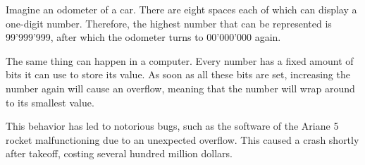 
Imagine an odometer of a car. There are eight spaces each of which can display a one-digit number. Therefore, the highest number that can be represented is 99'999'999, after which the odometer turns to 00'000'000 again.

The same thing can happen in a computer. Every number has a fixed amount of bits it can use to store its value. As soon as all these bits are set, increasing the number again will cause an overflow, meaning that the number will wrap around to its smallest value.

This behavior has led to notorious bugs, such as the software of the Ariane 5 rocket malfunctioning due to an unexpected overflow. This caused a crash shortly after takeoff, costing several hundred million dollars.

